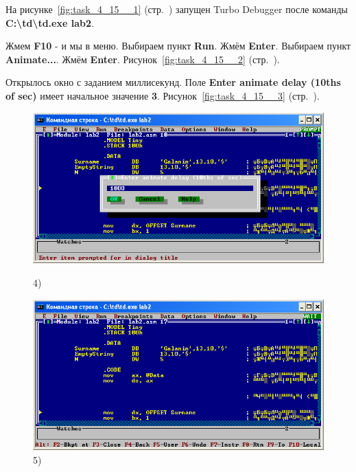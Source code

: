 На рисунке~\ref{fig:task_4_15__1} (стр.~\pageref{fig:task_4_15__1})
запущен Turbo Debugger после команды
\textbf{C:\textbackslash\/td\textbackslash\/td.exe lab2}.

Жмем \textbf{F10} - и мы в меню.
Выбираем пункт \textbf{Run}.
Жмём \textbf{Enter}.
Выбираем пункт \textbf{Animate...}.
Жмём \textbf{Enter}.
Рисунок~\ref{fig:task_4_15__2} (стр.~\pageref{fig:task_4_15__2}).

Открылось окно с заданием миллисекунд.
Поле \textbf{Enter animate delay (10ths of sec)} имеет начальное значение \textbf{3}.
Рисунок~\ref{fig:task_4_15__3} (стр.~\pageref{fig:task_4_15__3}).

\begin{figure}[!htp]
    \centering
    \begin{minipage}{0.32\textwidth}
        \centering
        \includegraphics[width=.99\linewidth]
            {../_INCLUDES/task-4-15/4.png}
        \caption{4) }
        \label{fig:task_4_15__4}
    \end{minipage}
    \begin {minipage}{0.32\textwidth}
        \centering
        \includegraphics[width=.99\linewidth]
            {../_INCLUDES/task-4-15/5.png}
        \caption{5) }
        \label{fig:task_4_15__5}

\end{minipage}
\end{figure}

